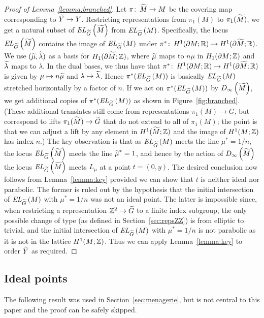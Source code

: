 \documentclass[tikz, sepfignums, defaultenums]{nmd/article}
\newcommand{\TEL}[1]{\mathit{EL}_\Gtil\left(#1\right)}
\newcommand{\SymTEL}[1]{D_\infty\left(#1\right)}
\begin{document}
\begin{proof}[Proof of Lemma~\ref{lemma:branched}]
Let $\pi \maps \Mtil \to M$ be the covering map corresponding to
$\Ytil \to Y$.  Restricting representations from $\pi_1(M)$ to
$\pi_1(\Mtil)$, we get a natural subset of $\TEL{\Mtil}$ from
$\TEL{M}$.  Specifically, the locus $\TEL{\Mtil}$ contains the image
of $\TEL{M}$ under
$\pi^* \maps H^1(\partial M; \R) \to H^1(\partial \Mtil; \R)$.  We use
$(\mutil, \lambdatil)$ as a basis for $H_1(\partial \Mtil; \Z)$, where
$\mutil$ maps to $n \mu$ in $H_1(\partial M;{\mathbb Z})$ and $\lambdatil$ maps
to $\lambda$.  In the dual bases, we thus have that
$\pi^* \maps H^1(\partial M; \R) \to H^1(\partial \Mtil; \R)$ is given
by $\mu \mapsto n \mutil$ and $\lambda \mapsto \lambdatil$.  Hence
$\pi^*(\TEL{M})$ is basically $\TEL{M}$ stretched horizontally by
a factor of $n$.  If we act on $\pi^*(\TEL{M})$ by $\SymTEL{\Mtil}$,
we get additional copies of $\pi^*(\TEL{M})$ as shown in
Figure~\ref{fig:branched}.  (These additional translates still come
from representations $\pi_1(M) \to G$, but correspond to lifts
$\pi_1(\Mtil) \to \Gtil$ that do not extend to all of $\pi_1(M)$; the
point is that we can adjust a lift by any element in $H^1(\Mtil; \Z)$
and the image of $H^1(M; {\mathbb Z})$ has index $n$.)  The key observation is
that as $\TEL{M}$ meets the line $\mu^* = 1/n$, the locus
$\TEL{\Mtil}$ meets the line $\mutil^* = 1$, and hence by the action of
$\SymTEL{\Mtil}$ the locus $\TEL{\Mtil}$ meets $L_\mu$ at a point
$t = (0, y)$.  The desired conclusion now follows from
Lemma~\ref{lemma:key} provided we can show that $t$ is neither ideal
nor parabolic.  The former is ruled out by the hypothesis that the
initial intersection of $\TEL{M}$ with $\mu^* = 1/n$ was not an ideal
point.  The latter is impossible since, when restricting a
representation $\Z^2 \to \Gtil$ to a finite index subgroup, the only
possible change of type (as defined in Section~\ref{sec:repsZZ}) is
from elliptic to trivial, and the initial intersection of $\TEL{M}$
with $\mu^* = 1/n$ is not parabolic as it is not in the lattice
$H^1(M; {\mathbb Z})$.  Thus we can apply Lemma~\ref{lemma:key} to order
$\Ytil$ as required.
\end{proof}

\subsection{Ideal points}  

The following result was used in Section~\ref{sec:menagerie}, but is not
central to this paper and the proof can be safely skipped. 
\end{document}
